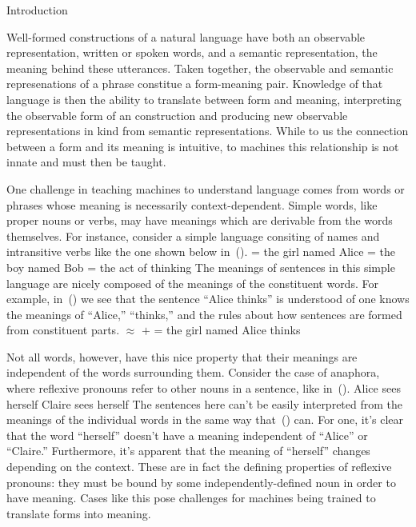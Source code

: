 \maketoc

\sec Introduction

Well-formed constructions of a natural language have both an observable 
representation, written or spoken words, and a semantic representation, the
meaning behind these utterances. Taken together, the observable and semantic
represenations of a phrase constitue a form-meaning pair. Knowledge of that
language is then the ability to translate between form and meaning, 
interpreting the observable form of an construction and producing new 
observable representations in kind from semantic representations. While to us
the connection between a form and its meaning is intuitive, to machines this
relationship is not innate and must then be taught. 

One challenge in teaching machines to understand language comes from words or
phrases whose meaning is necessarily context-dependent. Simple words, like
proper nouns or verbs, may have meanings which are derivable from the words 
themselves. For instance, consider a simple language consiting of names and
intransitive verbs like the one shown below in~(\nextx).
\pex
	\a{}   = the girl named Alice
	\a{}  = the boy named Bob
	\a{}  = the act of thinking
\xe
The meanings of sentences in this simple language are nicely composed of the
meanings of the constituent words. For example, in~(\nextx) we see that the
sentence ``Alice thinks'' is understood of one knows the meanings of ``Alice,''
``thinks,'' and the rules about how sentences are formed from constituent 
parts.
\ex{}
	 $\approx$  $+$  = the girl named Alice thinks
\xe

Not all words, however, have this nice property that their meanings are 
independent of the words surrounding them. Consider the case of anaphora, where
reflexive pronouns refer to other nouns in a sentence, like in~(\nextx).
\pex
	\a Alice sees herself
	\a Claire sees herself
\xe
The sentences here can't be easily interpreted from the meanings of the 
individual words in the same way that~(\blastx) can. For one, it's clear that
the word ``herself'' doesn't have a meaning independent of ``Alice'' or 
``Claire.'' Furthermore, it's apparent that the meaning of ``herself'' changes
depending on the context. These are in fact the defining properties of 
reflexive pronouns: they must be bound by some independently-defined noun in
order to have meaning. Cases like this pose challenges for machines being
trained to translate forms into meaning.

